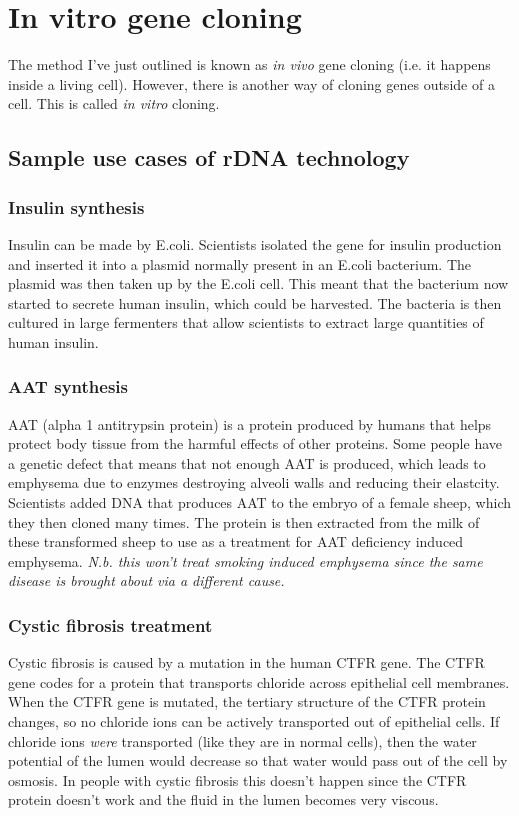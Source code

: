 \documentclass{article}
\begin{document}
\section*{In vitro gene cloning}

The method I've just outlined is known as {\it in vivo} gene cloning (i.e. it happens inside a living cell). However, there is another way of cloning genes outside of a cell. This is called {\it in vitro} cloning.


\subsection*{Sample use cases of rDNA technology}
\subsubsection*{Insulin synthesis}

Insulin can be made by E.coli. Scientists isolated the gene for insulin
production and inserted it into a plasmid normally present in an E.coli
bacterium. The plasmid was then taken up by the E.coli cell. This meant that the
bacterium now started to secrete human insulin, which could be harvested. The
bacteria is then cultured in large fermenters that allow scientists to extract
large quantities of human insulin.

\subsubsection*{AAT synthesis}

AAT (alpha 1 antitrypsin protein) is a protein produced by humans that helps
protect body tissue from the harmful effects of other proteins. Some people have
a genetic defect that means that not enough AAT is produced, which leads to
emphysema due to enzymes destroying alveoli walls and reducing their elastcity.
Scientists added DNA that produces AAT to the embryo of a female sheep, which
they then cloned many times. The protein is then extracted from the milk of
these transformed sheep to use as a treatment for AAT deficiency induced
emphysema. {\it N.b. this won't treat smoking induced emphysema since the same
disease is brought about via a different cause.}

\subsubsection*{Cystic fibrosis treatment}
Cystic fibrosis is caused by a mutation in the human CTFR gene. The CTFR gene
codes for a protein that transports chloride across epithelial cell membranes.
When the CTFR gene is mutated, the tertiary structure of the CTFR protein
changes, so no chloride ions can be actively transported out of epithelial
cells. If chloride ions {\it were} transported (like they are in normal cells),
then the water potential of the lumen would decrease so that water would pass
out of the cell by osmosis. In people with cystic fibrosis this doesn't happen
since the CTFR protein doesn't work and the fluid in the lumen becomes very
viscous. 
\end{document}
